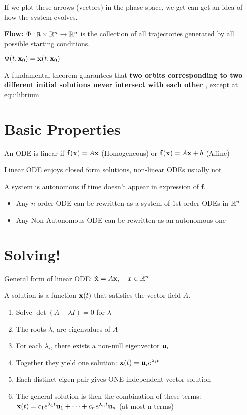 If we plot these arrows (vectors) in the phase space, we get can
get an idea of how the system evolves.

\textbf{Flow: } $\Phi: \mathtt{R} \times \mathbb{R}^n \to \mathbb{R}^n$ is the collection of
all trajectories generated by all possible starting conditions.

$\Phi(t, \mathbf{x}_0) = \mathbf{x}(t; \mathbf{x}_0)$


A fundamental theorem guarantees
that \textbf{two orbits corresponding to two different initial solutions never intersect with
each other }, except at equilibrium

\section*{Basic Properties}

An ODE is linear if $\mathbf{f}(\mathbf{x}) = A\mathbf{x}$ (Homogeneous) or 
$\mathbf{f}(\mathbf{x}) = A\mathbf{x} + b$ (Affine)

Linear ODE enjoys closed form solutions, non-linear ODEs usually not

A system is autonomous if time doesn't appear in expression of $\mathbf{f}$.

\begin{itemize}
    \item Any $n$-order ODE can be rewritten as a system of $1$st order ODEs in $\mathbb{R}^n$
    \item Any Non-Autonomous ODE can be rewritten as an autonomous one
\end{itemize}

\section*{Solving!}

General form of linear ODE:
$
\dot{\mathbf{x}} = A \mathbf{x}, \quad x \in \mathbb{R}^n
$

A solution is a function $\mathbf{x}(t)$ that satisfies the vector field $A$.

\begin{enumerate}
    \item Solve $\det(A - \lambda I) = 0$ for $\lambda$
    \item The roots $\lambda_i$ are eigenvalues of $A$
    \item For each $\lambda_i$, there exists a non-null eigenvector
    $\mathbf{u}_i$
    \item Together they yield one solution: $\mathbf{x}(t) = \mathbf{u}_i e^{\lambda_i t}$
    \item Each distinct eigen-pair gives ONE independent vector solution
    \item The general solution is then the combination of these terms:
    $\mathbf{x}(t) = c_1 e^{\lambda_1 t} \mathbf{u}_1 + \dots + c_n e^{\lambda_n t} \mathbf{u}_n$ (at most n terms)
\end{enumerate}

